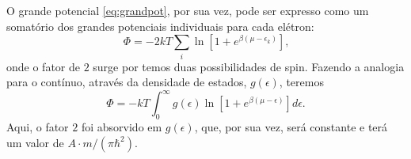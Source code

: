 \documentclass{article}
\begin{document}
O grande potencial \eqref{eq:grandpot}, por sua vez, pode ser expresso como um somatório dos grandes potenciais individuais
para cada elétron:
\begin{equation}
 \Phi = -2kT \sum_{i}\ln{\left[1+e^{\beta(\mu-\epsilon_k)}\right]}\text{,}
\end{equation}
onde o fator de $2$ surge por temos duas possibilidades de spin. Fazendo a analogia para o contínuo, através da densidade
de estados, $g(\epsilon)$, teremos
\begin{equation}\label{eq:phiintegral}
 \Phi = -kT \int_{0}^{\infty}g(\epsilon)\ln{\left[1+e^{\beta(\mu-\epsilon)}\right]} d\epsilon\text{.}
\end{equation}
Aqui, o fator $2$ foi absorvido em $g(\epsilon)$, que, por sua vez, será constante e terá um valor de $A\cdot m\slash(\pi \hbar^2)$.
\end{document}
